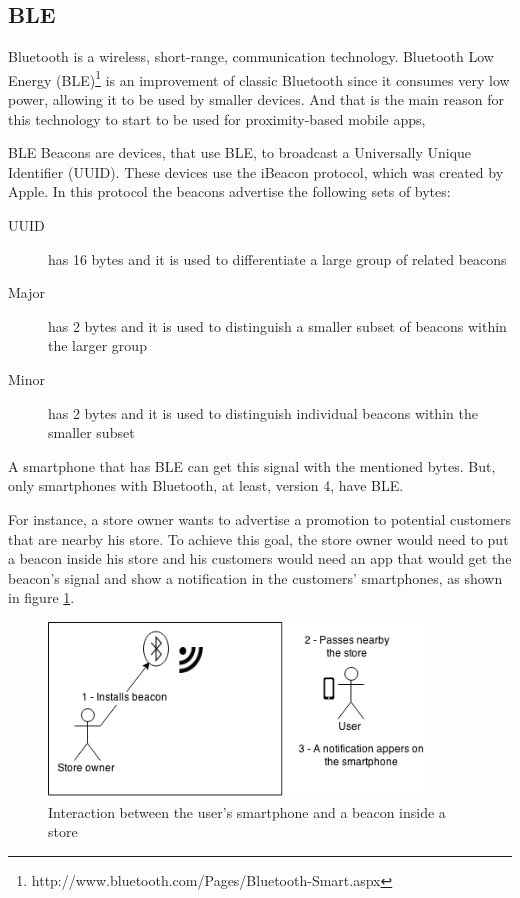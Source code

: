\subsection{BLE}
\label{sub:bluetooth_low_energy}
Bluetooth is a wireless, short-range, communication technology.
Bluetooth Low Energy (BLE)\footnote{http://www.bluetooth.com/Pages/Bluetooth-Smart.aspx} 
is an improvement of classic Bluetooth since it consumes 
very low power, allowing it to be used by smaller devices.
And that is the main reason for this technology to start to 
be used for proximity-based mobile apps,

BLE Beacons are devices, that use BLE, to broadcast a 
Universally Unique Identifier (UUID). 
These devices use the iBeacon protocol, which was created
by Apple\texttrademark. In this protocol the beacons
advertise the following sets of bytes:
\begin{description}
  \item[UUID] has 16 bytes and it is used to differentiate a 
  large group of related beacons
  \item[Major] has 2 bytes and it is used to distinguish a smaller 
  subset of beacons within the larger group
  \item[Minor] has 2 bytes and it is used to distinguish individual
  beacons within the smaller subset
\end{description}
A smartphone that
has BLE can get this signal with the mentioned bytes.
But, only smartphones
with Bluetooth, at least, version 4, have BLE.

For instance, a store owner wants to advertise a promotion
to potential customers that are nearby his store. To 
achieve this goal, the store owner would need to put
a beacon inside his store and his customers would need an
app that would get the beacon's signal and show a 
notification in the customers' smartphones,
as shown in figure \ref{fig:store_example}.
\begin{figure}[!ht]
  \centering
    \includegraphics[width=0.9\textwidth]{img/store_example}
    \caption{Interaction between the user's smartphone
    and a beacon inside a store}
    \label{fig:store_example}
\end{figure}

